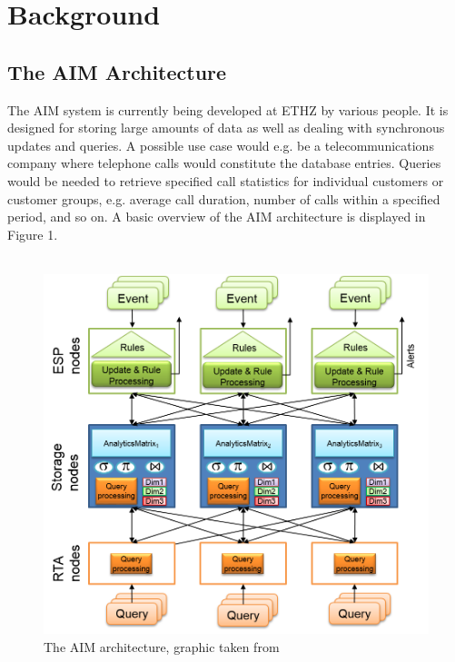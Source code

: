 \documentclass[11pt,singlecolumn]{scrartcl}
\begin{document}
\section{Background}
\subsection{The AIM Architecture}
The AIM system \cite{aim} is currently being developed at ETHZ by various people. It is designed for storing large amounts of data as well as dealing with synchronous updates and queries. A possible use case would e.g. be a telecommunications company where telephone calls would constitute the database entries. Queries would be needed to retrieve specified call statistics for individual customers or customer groups, e.g. average call duration, number of calls within a specified period, and so on. A basic overview of the AIM architecture is displayed in Figure 1.\\\\

\begin{figure}[h]
\includegraphics[scale=0.7]{layers.png}
\caption{The AIM architecture, graphic taken from \cite{aim}}
\end{figure}
\end{document}
